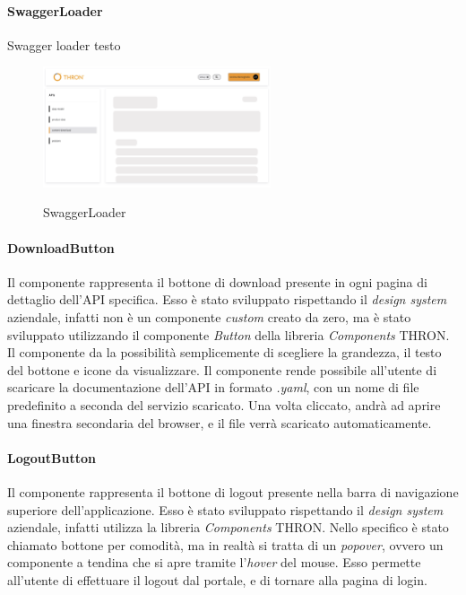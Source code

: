 \paragraph{SwaggerLoader}\label{par:swagger-loader}

Swagger loader testo
\begin{figure}[ht]
  \centering
  \includegraphics[width=0.6\textwidth, alt={Skeleton loader di caricamento per contenuto principale}]{images/frontend/SwaggerLoader.jpg}
  \caption{SwaggerLoader}\label{fig:swagger-loader}
\end{figure}

\paragraph{DownloadButton}\label{par:download-button}
Il componente rappresenta il bottone di download presente in ogni pagina di dettaglio dell'API specifica. Esso è stato sviluppato rispettando il \textit{design system}
aziendale, infatti non è un componente \textit{custom} creato da zero, ma è stato sviluppato utilizzando il componente \textit{Button} della libreria \textit{Components} THRON.
Il componente da la possibilità semplicemente di scegliere la grandezza, il testo del bottone e icone da visualizzare.
Il componente rende possibile all'utente di scaricare la documentazione dell'API in formato \textit{.yaml}, con un nome di file predefinito a seconda 
del servizio scaricato. Una volta cliccato, andrà ad aprire una finestra secondaria del browser, e il file verrà scaricato automaticamente.

\paragraph{LogoutButton}\label{par:logout-button}
Il componente rappresenta il bottone di logout presente nella barra di navigazione superiore dell'applicazione.
Esso è stato sviluppato rispettando il \textit{design system} aziendale, infatti utilizza la libreria \textit{Components} THRON.
Nello specifico è stato chiamato bottone per comodità, ma in realtà si tratta di un \textit{popover}, ovvero un componente a tendina che si apre
tramite l'\textit{hover} del mouse. Esso permette all'utente di effettuare il logout dal portale, e di tornare alla pagina di login.

